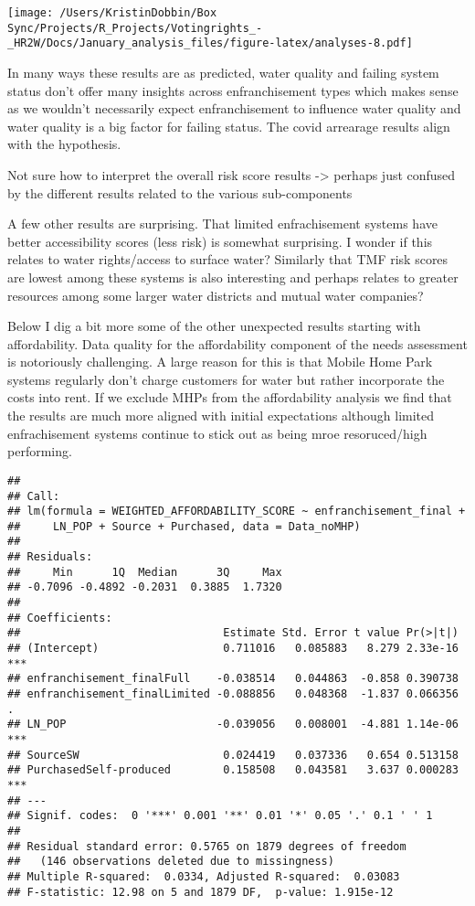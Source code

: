 \documentclass[
]{article}
\begin{document}
\texttt{[image: /Users/KristinDobbin/Box Sync/Projects/R\_Projects/Votingrights\_-\_HR2W/Docs/January\_analysis\_files/figure-latex/analyses-8.pdf]}

In many ways these results are as predicted, water quality and failing
system status don't offer many insights across enfranchisement types
which makes sense as we wouldn't necessarily expect enfranchisement to
influence water quality and water quality is a big factor for failing
status. The covid arrearage results align with the hypothesis.

Not sure how to interpret the overall risk score results -\textgreater{}
perhaps just confused by the different results related to the various
sub-components

A few other results are surprising. That limited enfrachisement systems
have better accessibility scores (less risk) is somewhat surprising. I
wonder if this relates to water rights/access to surface water?
Similarly that TMF risk scores are lowest among these systems is also
interesting and perhaps relates to greater resources among some larger
water districts and mutual water companies?

Below I dig a bit more some of the other unexpected results starting
with affordability. Data quality for the affordability component of the
needs assessment is notoriously challenging. A large reason for this is
that Mobile Home Park systems regularly don't charge customers for water
but rather incorporate the costs into rent. If we exclude MHPs from the
affordability analysis we find that the results are much more aligned
with initial expectations although limited enfrachisement systems
continue to stick out as being mroe resoruced/high performing.

\begin{verbatim}
## 
## Call:
## lm(formula = WEIGHTED_AFFORDABILITY_SCORE ~ enfranchisement_final + 
##     LN_POP + Source + Purchased, data = Data_noMHP)
## 
## Residuals:
##     Min      1Q  Median      3Q     Max 
## -0.7096 -0.4892 -0.2031  0.3885  1.7320 
## 
## Coefficients:
##                               Estimate Std. Error t value Pr(>|t|)    
## (Intercept)                   0.711016   0.085883   8.279 2.33e-16 ***
## enfranchisement_finalFull    -0.038514   0.044863  -0.858 0.390738    
## enfranchisement_finalLimited -0.088856   0.048368  -1.837 0.066356 .  
## LN_POP                       -0.039056   0.008001  -4.881 1.14e-06 ***
## SourceSW                      0.024419   0.037336   0.654 0.513158    
## PurchasedSelf-produced        0.158508   0.043581   3.637 0.000283 ***
## ---
## Signif. codes:  0 '***' 0.001 '**' 0.01 '*' 0.05 '.' 0.1 ' ' 1
## 
## Residual standard error: 0.5765 on 1879 degrees of freedom
##   (146 observations deleted due to missingness)
## Multiple R-squared:  0.0334, Adjusted R-squared:  0.03083 
## F-statistic: 12.98 on 5 and 1879 DF,  p-value: 1.915e-12
\end{verbatim}
\end{document}

